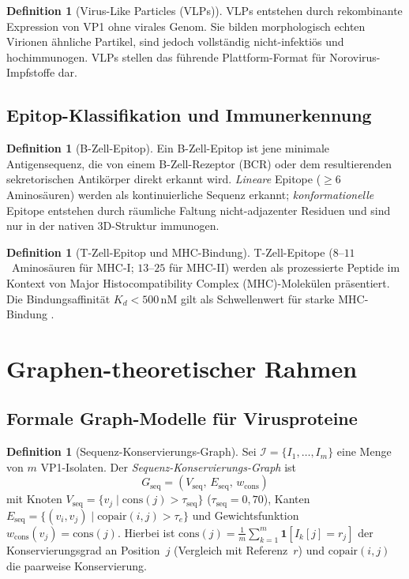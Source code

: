 ﻿\documentclass[a4paper,12pt]{article}
\theoremstyle{plain}
\theoremstyle{definition}
\newtheorem{definition}[satz]{Definition}
\theoremstyle{remark}
\begin{document}
\begin{definition}[Virus-Like Particles (VLPs)]
VLPs entstehen durch rekombinante Expression von VP1 ohne virales Genom. Sie bilden
morphologisch echten Virionen ähnliche Partikel, sind jedoch vollständig nicht-infektiös
und hochimmunogen. VLPs stellen das führende Plattform-Format für Norovirus-Impfstoffe dar.
\end{definition}

\subsection{Epitop-Klassifikation und Immunerkennung}

\begin{definition}[B-Zell-Epitop]
Ein B-Zell-Epitop ist jene minimale Antigensequenz, die von einem B-Zell-Rezeptor (BCR)
oder dem resultierenden sekretorischen Antikörper direkt erkannt wird.
\textit{Lineare} Epitope ($\geq\!6$ Aminosäuren) werden als kontinuierliche Sequenz erkannt;
\textit{konformationelle} Epitope entstehen durch räumliche Faltung nicht-adjazenter Residuen
und sind nur in der nativen 3D-Struktur immunogen.
\end{definition}

\begin{definition}[T-Zell-Epitop und MHC-Bindung]
T-Zell-Epitope ($8$--$11$~Aminosäuren für MHC-I; $13$--$25$ für MHC-II) werden als
prozessierte Peptide im Kontext von Major Histocompatibility Complex (MHC)-Molekülen
präsentiert. Die Bindungsaffinität $K_d < 500\,\text{nM}$ gilt als Schwellenwert für
starke MHC-Bindung \citep{netmhc2019}.
\end{definition}

\section{Graphen-theoretischer Rahmen}

\subsection{Formale Graph-Modelle für Virusproteine}

\begin{definition}[Sequenz-Konservierungs-Graph]
Sei $\mathcal{I} = \{I_1,\ldots,I_m\}$ eine Menge von $m$ VP1-Isolaten.
Der \emph{Sequenz-Konservierungs-Graph} ist
\[
  G_{\text{seq}} = (V_{\text{seq}},\, E_{\text{seq}},\, w_{\text{cons}})
\]
mit Knoten $V_{\text{seq}} = \{v_j \mid \text{cons}(j) > \tau_{\text{seq}}\}$
($\tau_{\text{seq}} = 0{,}70$), Kanten
$E_{\text{seq}} = \{(v_i,v_j)\mid \text{copair}(i,j) > \tau_e\}$ und
Gewichtsfunktion $w_{\text{cons}}(v_j) = \text{cons}(j)$.
Hierbei ist $\text{cons}(j) = \frac{1}{m}\sum_{k=1}^m \mathbf{1}[I_k[j] = r_j]$
der Konservierungsgrad an Position~$j$ (Vergleich mit Referenz~$r$) und
$\text{copair}(i,j)$ die paarweise Konservierung.
\end{definition}
\end{document}
